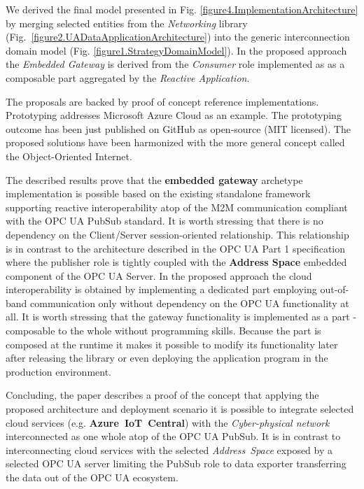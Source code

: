 \documentclass{article}
\begin{document}
We derived the final model presented in Fig. \ref*{figure4.ImplementationArchitecture} by merging selected entities from the \emph{Networking} library (Fig.~\ref*{figure2.UADataApplicationArchitecture}) into the generic interconnection domain model (Fig. \ref*{figure1.StrategyDomainModel}). In the proposed approach the \textit{Embedded Gateway} is derived from the \textit{Consumer} role implemented as as a composable part aggregated by the \textit{Reactive Application}.

The proposals are backed by proof of concept reference implementations. Prototyping addresses Microsoft Azure Cloud as an example. The prototyping outcome has been just published on GitHub as open-source (MIT licensed). The proposed solutions have been harmonized with the more general concept called the Object-Oriented Internet.

The described results prove that the \textbf{embedded gateway} archetype implementation is possible based on the existing standalone framework supporting reactive interoperability atop of the M2M communication compliant with the OPC UA PubSub standard. It is worth stressing that there is no dependency on the Client/Server session-oriented relationship. This relationship is in contrast to the architecture described in the OPC UA Part 1 \cite{OPCUAPart1} specification where the publisher role is tightly coupled with the \textbf{Address Space} embedded component of the OPC UA Server. In the proposed approach the cloud interoperability is obtained by implementing a dedicated part employing out-of-band communication only without dependency on the OPC UA functionality at all. It is worth stressing that the gateway functionality is implemented as a part - composable to the whole without programming skills. Because the part is composed at the runtime it makes it possible to modify its functionality later after releasing the library or even deploying the application program in the production environment.

Concluding, the paper describes a proof of the concept that applying the proposed architecture and deployment scenario it is possible to integrate selected cloud services (e.g. \textbf{Azure\ IoT\ Central}) with the \emph{Cyber-physical network} interconnected as one whole atop of the OPC UA PubSub. It is in contrast to interconnecting cloud services with the selected \emph{ Address\ Space} exposed by a selected OPC UA server limiting the PubSub role to data exporter transferring the data out of the OPC UA ecosystem.



\end{document}
